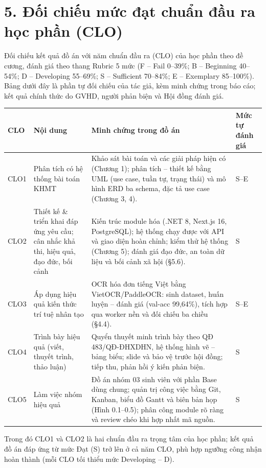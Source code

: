 \section*{5. Đối chiếu mức đạt chuẩn đầu ra học phần (CLO)}
Đối chiếu kết quả đồ án với năm chuẩn đầu ra (CLO) của học phần theo đề cương, đánh giá theo thang Rubric 5 mức (F – Fail 0–39\%; B – Beginning 40–54\%; D – Developing 55–69\%; S – Sufficient 70–84\%; E – Exemplary 85–100\%). Bảng dưới đây là phần tự đối chiếu của tác giả, kèm minh chứng trong báo cáo; kết quả chính thức do GVHD, người phản biện và Hội đồng đánh giá.

\begin{center}{\small\singlespacing\renewcommand{\arraystretch}{1.3}
\begin{tabular}{|>{\centering\arraybackslash}p{1.15cm}|>{\raggedright\arraybackslash}p{3.7cm}|>{\raggedright\arraybackslash}p{7.0cm}|>{\centering\arraybackslash}p{1.4cm}|}
\hline
\textbf{CLO} & \textbf{Nội dung} & \textbf{Minh chứng trong đồ án} & \textbf{Mức tự đánh giá} \\ \hline
CLO1 & Phân tích có hệ thống bài toán KHMT & Khảo sát bài toán và các giải pháp hiện có (Chương 1); phân tích – thiết kế bằng UML (use case, tuần tự, trạng thái) và mô hình ERD ba schema, đặc tả use case (Chương 3, 4). & S–E \\ \hline
CLO2 & Thiết kế \& triển khai đáp ứng yêu cầu; cân nhắc khả thi, hiệu quả, đạo đức, bối cảnh & Kiến trúc module hóa (.NET 8, Next.js 16, PostgreSQL); hệ thống chạy được với API và giao diện hoàn chỉnh; kiểm thử hệ thống (Chương 5); đánh giá đạo đức, an toàn dữ liệu và bối cảnh xã hội (§5.6). & S \\ \hline
CLO3 & Áp dụng hiệu quả kiến thức trí tuệ nhân tạo & OCR hóa đơn tiếng Việt bằng VietOCR/PaddleOCR: sinh dataset, huấn luyện – đánh giá (val-acc 99,64\%), tích hợp qua worker nền và đối chiếu ba chiều (§4.4). & S–E \\ \hline
CLO4 & Trình bày hiệu quả (viết, thuyết trình, thảo luận) & Quyển thuyết minh trình bày theo QĐ 483/QĐ-ĐHXDHN, hệ thống hình vẽ – bảng biểu; slide và bảo vệ trước hội đồng; tiếp thu, phản hồi ý kiến phản biện. & S \\ \hline
CLO5 & Làm việc nhóm hiệu quả & Đồ án nhóm 03 sinh viên với phần Base dùng chung; quản trị công việc bằng Git, Kanban, biểu đồ Gantt và biên bản họp (Hình 0.1–0.5); phân công module rõ ràng và review chéo khi hợp nhất mã nguồn. & S \\ \hline
\end{tabular}}\end{center}
Trong đó CLO1 và CLO2 là hai chuẩn đầu ra trọng tâm của học phần; kết quả đồ án đáp ứng từ mức Đạt (S) trở lên ở cả năm CLO, phù hợp ngưỡng công nhận hoàn thành (mỗi CLO tối thiểu mức Developing – D).

